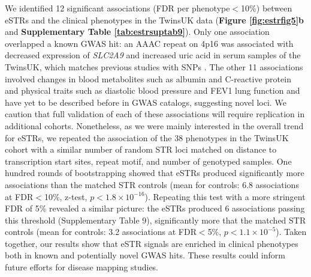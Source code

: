 We identified 12 significant associations (FDR per phenotype$<$10\%) between eSTRs and the clinical phenotypes in the TwinsUK data (\textbf{Figure \ref{fig:estrfig5}b} and \textbf{Supplementary Table \ref{tab:estrsuptab9}}). Only one association overlapped a known GWAS hit: an AAAC repeat on 4p16 was associated with decreased expression of \emph{SLC2A9} and increased uric acid in serum samples of the TwinsUK, which matches previous studies with SNPs \cite{DoringGiegerMehtaEtAl2008,VitartRudanHaywardEtAl2008,WallaceNewhouseBraundEtAl2008,ShinFaumanPetersenEtAl2014}. The other 11 associations involved changes in blood metabolites such as albumin and C-reactive protein and physical traits such as diastolic blood pressure and FEV1 lung function and have yet to be described before in GWAS catalogs, suggesting novel loci. We caution that full validation of each of these associations will require replication in additional cohorts. Nonetheless, as we were mainly interested in the overall trend for eSTRs, we repeated the association of the 38 phenotypes in the TwinsUK cohort with a similar number of random STR loci matched on distance to transcription start sites, repeat motif, and number of genotyped samples. One hundred rounds of bootstrapping showed that eSTRs produced significantly more associations than the matched STR controls (mean for controls: 6.8 associations at FDR$<$10\%, z-test, $p<1.8\times 10^{-16}$). Repeating this test with a more stringent FDR of 5\% revealed a similar picture: the eSTRs produced 6 associations passing this threshold (Supplementary Table 9), significantly more that the matched STR controls (mean for controls: 3.2 associations at FDR$<$5\%, $p<1.1\times10^{-5}$). Taken together, our results show that eSTR signals are enriched in clinical phenotypes both in known and potentially novel GWAS hits. These results could inform future efforts for disease mapping studies.


